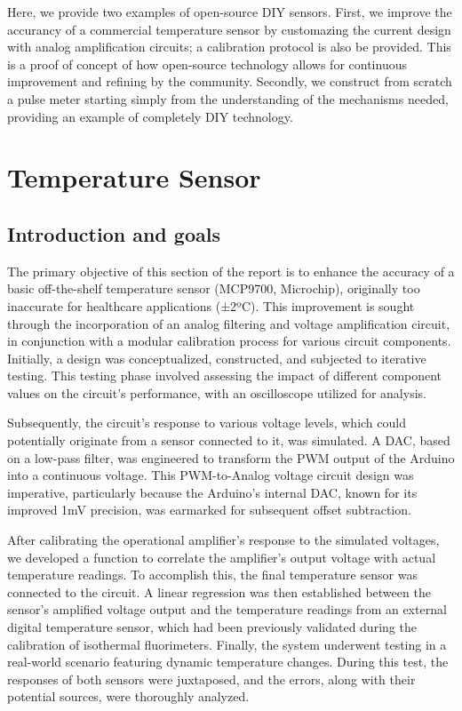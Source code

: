 \documentclass[conference]{IEEEtran}
\begin{document}
Here, we provide two examples of open-source DIY sensors. First, we improve 
the accurancy of a commercial temperature sensor by customazing the current design 
with analog amplification circuits; a calibration protocol is also be provided. 
This is a proof of concept of how open-source technology allows for continuous 
improvement and refining by the community. Secondly, we construct from scratch 
a pulse meter starting simply from the understanding of the mechanisms 
needed, providing an example of completely DIY technology.


\section{Temperature Sensor} %
   \subsection{Introduction and goals}
   The primary objective of this section of the report is to enhance the 
accuracy of a basic off-the-shelf temperature sensor (MCP9700, Microchip), originally too 
inaccurate for healthcare applications (±2ºC). This improvement is sought 
through the incorporation of an analog filtering and voltage amplification 
circuit, in conjunction with a modular calibration process for various 
circuit components. Initially, a design was conceptualized, constructed, 
and subjected to iterative testing. This testing phase involved assessing 
the impact of different component values on the circuit's performance, 
with an oscilloscope utilized for analysis.

Subsequently, the circuit's response to various voltage levels, which could 
potentially originate from a sensor connected to it, was simulated. A DAC, 
based on a low-pass filter, was engineered to transform the PWM output of 
the Arduino into a continuous voltage. This PWM-to-Analog voltage circuit 
design was imperative, particularly because the Arduino's internal DAC, 
known for its improved 1mV precision, was earmarked for subsequent offset 
subtraction.

After calibrating the operational amplifier's response to the simulated 
voltages, we developed a function to correlate the amplifier's output 
voltage with actual temperature readings. To accomplish this, the final 
temperature sensor was connected to the circuit. A linear regression was 
then established between the sensor's amplified voltage output and the 
temperature readings from an external digital temperature sensor, which had 
been previously validated during the calibration of isothermal fluorimeters. 
Finally, the system underwent testing in a real-world scenario featuring 
dynamic temperature changes. During this test, the responses of both sensors 
were juxtaposed, and the errors, along with their potential sources, were 
thoroughly analyzed.
\end{document}
